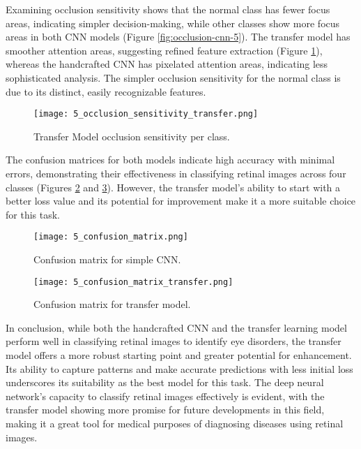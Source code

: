 \documentclass[a4paper,12pt]{article}
\begin{document}
Examining occlusion sensitivity shows that the normal class has fewer focus areas, indicating simpler decision-making, while other classes show more focus areas in both CNN models (Figure \ref{fig:occlusion-cnn-5}). The transfer model has smoother attention areas, suggesting refined feature extraction (Figure \ref{fig:occlusion-transfer-5}), whereas the handcrafted CNN has pixelated attention areas, indicating less sophisticated analysis. The simpler occlusion sensitivity for the normal class is due to its distinct, easily recognizable features.


\begin{figure}[h]
  \centering
  \texttt{[image: 5\_occlusion\_sensitivity\_transfer.png]}
  \caption{Transfer Model occlusion sensitivity per class.}
  \label{fig:occlusion-transfer-5}
\end{figure}


The confusion matrices for both models indicate high accuracy with minimal errors, demonstrating their effectiveness in classifying retinal images across four classes (Figures \ref{fig:confusion-matrix-cnn-5} and \ref{fig:confusion-matrix-transfer-5}). However, the transfer model's ability to start with a better loss value and its potential for improvement make it a more suitable choice for this task.

\begin{figure}[h]
  \centering
  \texttt{[image: 5\_confusion\_matrix.png]}
  \caption{Confusion matrix for simple CNN.}
  \label{fig:confusion-matrix-cnn-5}
\end{figure}


\begin{figure}[h]
  \centering
  \texttt{[image: 5\_confusion\_matrix\_transfer.png]}
  \caption{Confusion matrix for transfer model.}
  \label{fig:confusion-matrix-transfer-5}
\end{figure}


In conclusion, while both the handcrafted CNN and the transfer learning model perform well in classifying retinal images to identify eye disorders, the transfer model offers a more robust starting point and greater potential for enhancement. Its ability to capture patterns and make accurate predictions with less initial loss underscores its suitability as the best model for this task. The deep neural network's capacity to classify retinal images effectively is evident, with the transfer model showing more promise for future developments in this field, making it a great tool for medical purposes of diagnosing diseases using retinal images.




% 
% 
\end{document}
